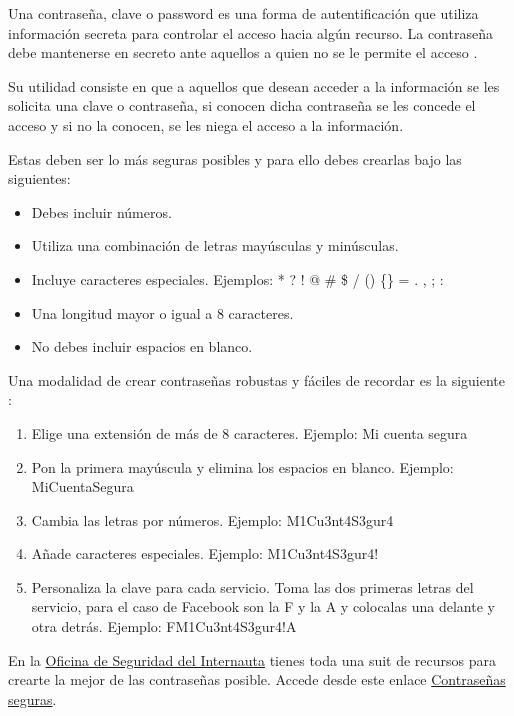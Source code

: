 \documentclass[
  spanish,
  a4paper,
  openany]{book}
\begin{document}
Una contraseña, clave o password es una forma de autentificación que utiliza información secreta para controlar el acceso hacia algún recurso. La contraseña debe mantenerse en secreto ante aquellos a quien no se le permite el acceso \citep{WIKI-password}.

Su utilidad consiste en que a aquellos que desean acceder a la información se les solicita una clave o contraseña, si conocen dicha contraseña se les concede el acceso y si no la conocen, se les niega el acceso a la información.

Estas deben ser lo más seguras posibles y para ello debes crearlas bajo las siguientes:

\begin{itemize}
\item
  Debes incluir números.
\item
  Utiliza una combinación de letras mayúsculas y minúsculas.
\item
  Incluye caracteres especiales. Ejemplos: * ? ! @ \# \$ / () \{\} = . , ; :
\item
  Una longitud mayor o igual a 8 caracteres.
\item
  No debes incluir espacios en blanco.
\end{itemize}

Una modalidad de crear contraseñas robustas y fáciles de recordar es la siguiente \citep{OSI-contraseñas}:

\begin{enumerate}
\def\labelenumi{\arabic{enumi}.}
\item
  Elige una extensión de más de 8 caracteres. Ejemplo: Mi cuenta segura
\item
  Pon la primera mayúscula y elimina los espacios en blanco. Ejemplo: MiCuentaSegura
\item
  Cambia las letras por números. Ejemplo: M1Cu3nt4S3gur4
\item
  Añade caracteres especiales. Ejemplo: M1Cu3nt4S3gur4!
\item
  Personaliza la clave para cada servicio. Toma las dos primeras letras del servicio, para el caso de Facebook son la F y la A y colocalas una delante y otra detrás. Ejemplo: FM1Cu3nt4S3gur4!A
\end{enumerate}

En la \href{https://www.osi.es/es}{Oficina de Seguridad del Internauta} tienes toda una suit de recursos para crearte la mejor de las contraseñas posible. Accede desde este enlace \href{https://www.osi.es/es/campanas/contrasenas-seguras}{Contraseñas seguras}.
\end{document}
